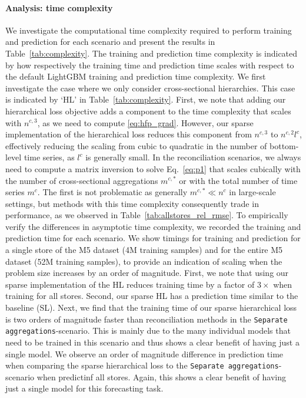 \documentclass[preprint, 3p, times, twocolumn]{elsarticle}
\begin{document}
  \paragraph{Analysis: time complexity} \label{par:timecomplexity} We investigate the computational time complexity required to perform training and prediction for each scenario and present the results in Table~\ref{tab:complexity}. The training and prediction time complexity is indicated by how respectively the training time and prediction time scales with respect to the default LightGBM training and prediction time complexity. We first investigate the case where we only consider cross-sectional hierarchies. This case is indicated by `HL' in Table~\ref{tab:complexity}. First, we note that adding our hierarchical loss objective adds a component to the time complexity that scales with \(n^{c,3}\), as we need to compute \eqref{eq:hfp_grad}. However, our sparse implementation of the hierarchical loss reduces this component from \(n^{c,3}\) to \(n^{c,2}l^c\), effectively reducing the scaling from cubic to quadratic in the number of bottom-level time series, as \(l^c\) is generally small. In the reconciliation scenarios, we always need to compute a matrix inversion to solve Eq.~\eqref{eq:p1} that scales cubically with the number of cross-sectional aggregations \(m^{c,*}\) or with the total number of time series \(m^c\). The first is not problematic as generally \(m^{c,*} \ll n^c\) in large-scale settings, but methods with this time complexity consequently trade in performance, as we observed in Table~\ref{tab:allstores_rel_rmse}. To empirically verify the differences in asymptotic time complexity, we recorded the training and prediction time for each scenario. We show timings for training and prediction for a single store of the M5 dataset (4M training samples) and for the entire M5 dataset (52M training samples), to provide an indication of scaling when the problem size increases by an order of magnitude. First, we note that using our sparse implementation of the HL reduces training time by a factor of \(3\times\) when training for all stores. Second, our sparse HL has a prediction time similar to the baseline (SL). 
  Next, we find that the training time of our sparse hierarchical loss is two orders of magnitude faster than reconciliation methods in the \texttt{Separate aggregations}-scenario. This is mainly due to the many individual models that need to be trained in this scenario and thus shows a clear benefit of having just a single model. We observe an order of magnitude difference in prediction time when comparing the sparse hierarchical loss to the \texttt{Separate aggregations}-scenario when predictinf all stores. Again, this shows a clear benefit of having just a single model for this forecasting task. 
\end{document}
